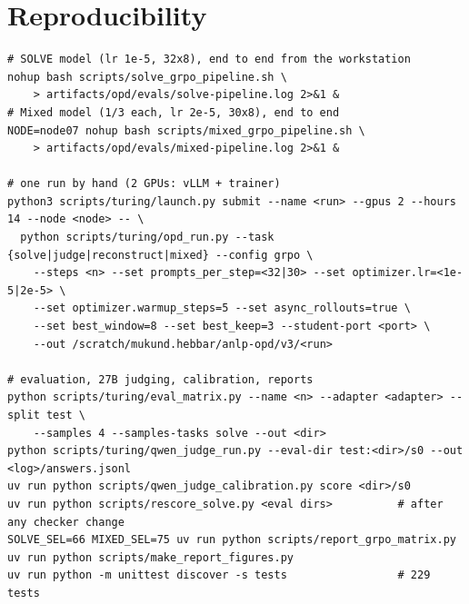 \documentclass[10pt,a4paper]{article}
\begin{document}
\section{Reproducibility}
\begin{verbatim}
# SOLVE model (lr 1e-5, 32x8), end to end from the workstation
nohup bash scripts/solve_grpo_pipeline.sh \
    > artifacts/opd/evals/solve-pipeline.log 2>&1 &
# Mixed model (1/3 each, lr 2e-5, 30x8), end to end
NODE=node07 nohup bash scripts/mixed_grpo_pipeline.sh \
    > artifacts/opd/evals/mixed-pipeline.log 2>&1 &

# one run by hand (2 GPUs: vLLM + trainer)
python3 scripts/turing/launch.py submit --name <run> --gpus 2 --hours 14 --node <node> -- \
  python scripts/turing/opd_run.py --task {solve|judge|reconstruct|mixed} --config grpo \
    --steps <n> --set prompts_per_step=<32|30> --set optimizer.lr=<1e-5|2e-5> \
    --set optimizer.warmup_steps=5 --set async_rollouts=true \
    --set best_window=8 --set best_keep=3 --student-port <port> \
    --out /scratch/mukund.hebbar/anlp-opd/v3/<run>

# evaluation, 27B judging, calibration, reports
python scripts/turing/eval_matrix.py --name <n> --adapter <adapter> --split test \
    --samples 4 --samples-tasks solve --out <dir>
python scripts/turing/qwen_judge_run.py --eval-dir test:<dir>/s0 --out <log>/answers.jsonl
uv run python scripts/qwen_judge_calibration.py score <dir>/s0
uv run python scripts/rescore_solve.py <eval dirs>          # after any checker change
SOLVE_SEL=66 MIXED_SEL=75 uv run python scripts/report_grpo_matrix.py
uv run python scripts/make_report_figures.py
uv run python -m unittest discover -s tests                 # 229 tests
\end{verbatim}
\end{document}
